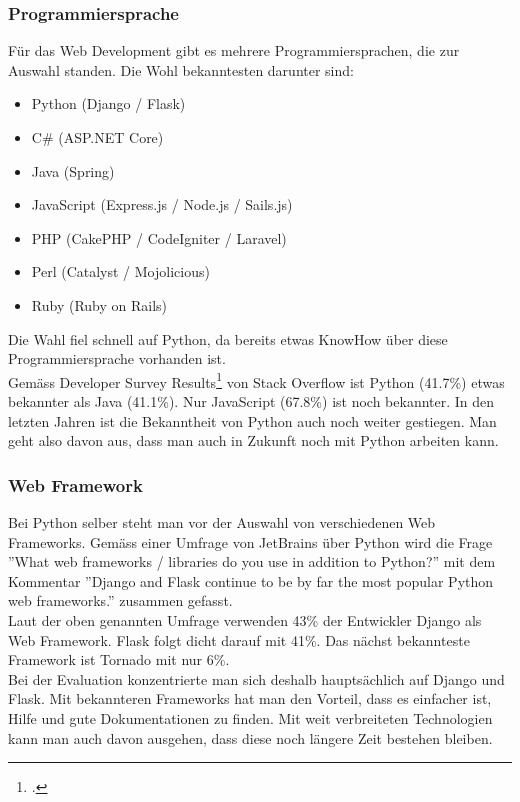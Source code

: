 \subsubsection*{Programmiersprache}
Für das Web Development gibt es mehrere Programmiersprachen, die zur Auswahl standen. Die Wohl bekanntesten darunter sind:


\begin{itemize}
	\item Python (Django / Flask)
	\item C\# (ASP.NET Core)
	\item Java (Spring)
	\item JavaScript (Express.js / Node.js / Sails.js)
	\item PHP (CakePHP / CodeIgniter / Laravel)
	\item Perl (Catalyst / Mojolicious)
	\item Ruby (Ruby on Rails)
\end{itemize}


Die Wahl fiel schnell auf Python, da bereits etwas KnowHow über diese Programmiersprache vorhanden ist. \\
Gemäss Developer Survey Results\footcite{developer_survey_results} von Stack Overflow ist Python (41.7\%) etwas bekannter als Java (41.1\%). Nur JavaScript (67.8\%) ist noch bekannter. In den letzten Jahren ist die Bekanntheit von Python auch noch weiter gestiegen. Man geht also davon aus, dass man auch in Zukunft noch mit Python arbeiten kann.


\subsubsection*{Web Framework}
Bei Python selber steht man vor der Auswahl von verschiedenen Web Frameworks. Gemäss einer Umfrage von JetBrains über Python wird die Frage ''What web frameworks / libraries do you use in addition to Python?'' mit dem Kommentar ''Django and Flask continue to be by far the most popular Python web frameworks.'' zusammen gefasst. \\
Laut der oben genannten Umfrage verwenden 43\% der Entwickler  Django als Web Framework. Flask folgt dicht darauf mit 41\%. Das nächst bekannteste Framework ist Tornado mit nur 6\%. \\
Bei der Evaluation konzentrierte man sich deshalb hauptsächlich auf Django und Flask. Mit bekannteren Frameworks hat man den Vorteil, dass es einfacher ist, Hilfe und gute Dokumentationen zu finden. Mit weit verbreiteten Technologien kann man auch davon ausgehen, dass diese noch längere Zeit bestehen bleiben.  \\ 

